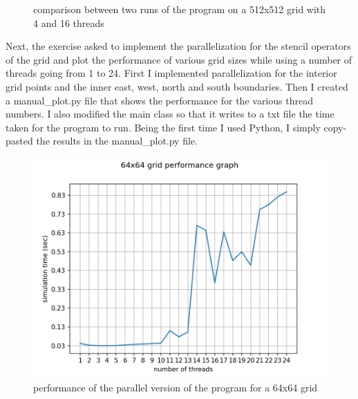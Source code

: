 \documentclass[unicode,11pt,a4paper,oneside,numbers=endperiod,openany]{scrartcl}
\begin{document}
\begin{figure}[H]
\centering
  \hfill
  \caption{comparison between two runs of the program on a 512x512 grid with 4 and 16 threads}
\end{figure}
Next, the exercise asked to implement the parallelization for the stencil operators of the grid and plot the performance of various grid sizes while using a number of threads going from 1 to 24.
\newline
First I implemented parallelization for the interior grid points and the inner east, west, north and south boundaries.
\newline
Then I created a manual\_plot.py file that shows the performance for the various thread numbers.
\newline
I also modified the main class so that it writes to a txt file the time taken for the program to run.
\newline
Being the first time I used Python, I simply copy-pasted the results in the manual\_plot.py file.
\newline
\begin{figure}[H]
\centering
\includegraphics[width=0.8\linewidth]{64manualplot.png}
\caption{performance of the parallel version of the program for a 64x64 grid}
\end{figure}
\end{document}

